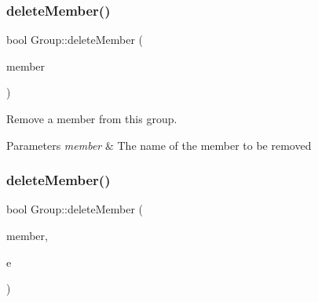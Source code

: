 \subsubsection{\texorpdfstring{delete\+Member()}{deleteMember()}\hspace{0.1cm}{\footnotesize\ttfamily [1/2]}}
{\footnotesize\ttfamily bool Group\+::delete\+Member (\begin{DoxyParamCaption}\item[{const \hyperlink{namespaceshaan97_1_1sync_af59c2c9185f7cde547b79fbe0bf8ec71}{Member\+Name} \&}]{member }\end{DoxyParamCaption})}

Remove a member from this group. 
\begin{DoxyParams}{Parameters}
{\em member} & The name of the member to be removed \\
\hline
\end{DoxyParams}
\mbox{\label{classshaan97_1_1sync_1_1_group_a3dc73fcdebd5cbdb1203b16946e283e7}} 
\subsubsection{\texorpdfstring{delete\+Member()}{deleteMember()}\hspace{0.1cm}{\footnotesize\ttfamily [2/2]}}
{\footnotesize\ttfamily bool Group\+::delete\+Member (\begin{DoxyParamCaption}\item[{const \hyperlink{namespaceshaan97_1_1sync_af59c2c9185f7cde547b79fbe0bf8ec71}{Member\+Name} \&}]{member,  }\item[{\hyperlink{classshaan97_1_1sync_1_1_error}{Error} \&}]{e }\end{DoxyParamCaption})}





